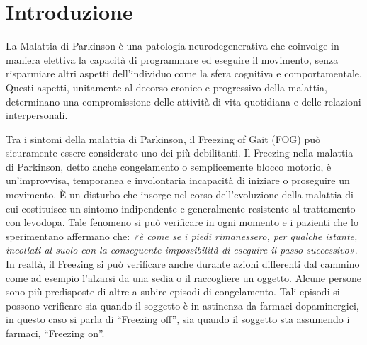 


\chapter{Introduzione}\label{cap1:Introduzione}

La Malattia di Parkinson è una patologia neurodegenerativa che coinvolge in maniera elettiva la capacità di programmare ed eseguire il movimento, senza risparmiare altri aspetti dell’individuo come la sfera cognitiva e comportamentale. Questi aspetti, unitamente al decorso cronico e progressivo della malattia, determinano una compromissione delle attività di vita quotidiana e delle relazioni interpersonali.

Tra i sintomi della malattia di Parkinson, il Freezing of Gait (FOG) può sicuramente essere considerato uno dei più debilitanti. Il Freezing nella malattia di Parkinson, detto anche congelamento o semplicemente blocco motorio, è un’improvvisa, temporanea e involontaria incapacità di iniziare o proseguire un movimento. È un disturbo che insorge nel corso dell’evoluzione della malattia di cui costituisce un sintomo indipendente e generalmente resistente al trattamento con levodopa. Tale fenomeno si può verificare in ogni momento e i pazienti che lo sperimentano affermano che: \textit{«è come se i piedi rimanessero, per qualche istante, incollati al suolo con la conseguente impossibilità di eseguire il passo successivo»}. In realtà, il Freezing si può verificare anche durante azioni differenti dal cammino come ad esempio l’alzarsi da una sedia o il raccogliere un oggetto. Alcune persone sono più predisposte di altre a subire episodi di congelamento. Tali episodi si possono verificare sia quando il soggetto è in astinenza da farmaci dopaminergici, in questo caso si parla di “Freezing off”, sia quando il soggetto sta assumendo i farmaci, “Freezing on”. \\

